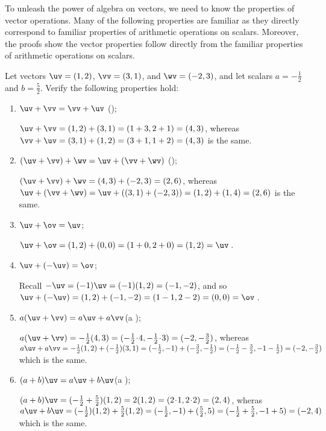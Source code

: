 To unleash the power of algebra on vectors, we need to know the properties of vector operations.
Many of the following properties are familiar as they directly correspond to familiar properties of arithmetic operations on scalars.
Moreover, the proofs show the vector properties follow directly from the familiar properties of arithmetic operations on scalars.

\begin{example} \label{eg:}
Let vectors \(\uv=(1,2)\), \(\vv=(3,1)\), and \(\wv=(-2,3)\), and let scalars \(a=-\tfrac12\) and \(b=\tfrac52\).
Verify the following properties hold:
\begin{enumerate}
\item \(\uv+\vv=\vv+\uv\) \quad();
\begin{solution} 
\(\uv+\vv=(1,2)+(3,1) =(1+3,2+1) =(4,3)\), whereas \(\vv+\uv =(3,1)+(1,2) =(3+1,1+2)=(4,3)\) is the same. 
\end{solution}

\item \((\uv+\vv)+\wv=\uv+(\vv+\wv)\) \quad();
\begin{solution} 
\((\uv+\vv)+\wv =(4,3)+(-2,3) =(2,6)\), whereas 
\(\uv+(\vv+\wv) =\uv+((3,1)+(-2,3)) =(1,2)+(1,4) =(2,6)\) is the same.
\end{solution}

\item \(\uv+\ov=\uv\);
\begin{solution} 
\(\uv+\ov=(1,2)+(0,0)=(1+0,2+0)=(1,2)=\uv\)\,. 
\end{solution}

\item \(\uv+(-\uv)=\ov\);
\begin{solution} 
Recall \(-\uv=(-1)\uv=(-1)(1,2)=(-1,-2)\), and so \(\uv+(-\uv) =(1,2)+(-1,-2)=(1-1,2-2)=(0,0)=\ov\)\,. 
\end{solution}

\item \(a(\uv+\vv)=a\uv+a\vv\)\quad(a );
\begin{solution} 
\(a(\uv+\vv)=-\tfrac12(4,3) =(-\tfrac12\cdot4,-\tfrac12\cdot3) =(-2,-\tfrac32)\), whereas \(a\uv+a\vv =-\tfrac12(1,2)+(-\tfrac12)(3,1) =(-\tfrac12,-1)+(-\tfrac32,-\tfrac12) =(-\tfrac12-\tfrac32,-1-\tfrac12) =(-2,-\tfrac32)\) which is the same.
\end{solution}

\item \((a+b)\uv=a\uv+b\uv\)\quad(a );
\begin{solution} 
\((a+b)\uv=(-\tfrac12+\tfrac52)(1,2) =2(1,2) =(2\cdot1,2\cdot2) =(2,4)\), wheras \(a\uv+b\uv = (-\tfrac12)(1,2)+\tfrac52(1,2) =(-\tfrac12,-1)+(\tfrac52,5) =(-\tfrac12+\tfrac52,-1+5) =(-2,4)\) which is the same.
\end{solution}


\end{enumerate}
\end{example}
